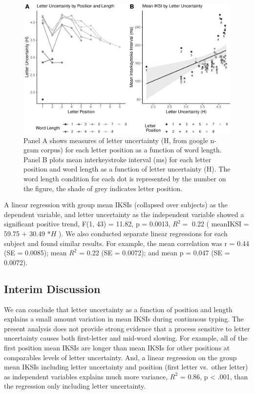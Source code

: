 \documentclass[floatsintext,man]{apa6}
\theoremstyle{definition}
\theoremstyle{definition}
\theoremstyle{definition}
\theoremstyle{remark}
\begin{document}
\begin{figure}[htbp]
\centering
\includegraphics{Entropy_typing_draft_files/figure-latex/letter-uncertainty-by-IKSI-1.pdf}
\caption{\label{fig:letter-uncertainty-by-IKSI}Panel A shows measures of letter
uncertainty (H, from google n-gram corpus) for each letter position as a
function of word length. Panel B plots mean interkeystroke interval (ms)
for each letter position and word length as a function of letter
uncertainty (H). The word length condition for each dot is represented
by the number on the figure, the shade of grey indicates letter
position.}
\end{figure}

A linear regression with group mean IKSIs (collapsed over subjects) as
the dependent variable, and letter uncertainty as the independent
variable showed a significant positive trend, F(1, 43) = 11.82, p =
0.0013, \(R^2 =\) 0.22 ( meanIKSI = 59.75 \(+\) 30.49 \(* H\) ). We also
conducted separate linear regressions for each subject and found similar
results. For example, the mean correlation was r = 0.44 (SE = 0.0085);
mean \(R^2\) = 0.22 (SE = 0.0072); and mean p = 0.047 (SE = 0.0072).

\subsection{Interim Discussion}\label{interim-discussion}

We can conclude that letter uncertainty as a function of position and
length explains a small amount variation in mean IKSIs during continuous
typing. The present analysis does not provide strong evidence that a
process sensitive to letter uncertainty causes both first-letter and
mid-word slowing. For example, all of the first position mean IKSIs are
longer than mean IKSIs for other positions at comparables levels of
letter uncertainty. And, a linear regression on the group mean IKSIs
including letter uncertainty and position (first letter vs.~other
letter) as independent variables explains much more variance, \(R^2\) =
0.86, p \textless{} .001, than the regression only including letter
uncertainty.
\end{document}

